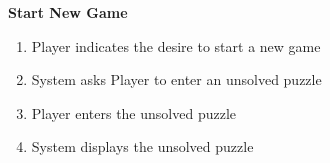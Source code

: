 \documentclass[letterpaper]{article}
\begin{document}
\noindent
\textbf{Start New Game}
\begin{enumerate}
\item Player indicates the desire to start a new game
\item System asks Player to enter an unsolved puzzle
\item Player enters the unsolved puzzle
\item System displays the unsolved puzzle
\end{enumerate}
\end{document}
